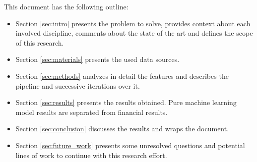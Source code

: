 This document has the following outline:
\begin{itemize}
    \item Section \ref{sec:intro} presents the problem to solve, provides context about each involved discipline, comments about the state of the art and defines the scope of this research.
    \item Section \ref{sec:materials} presents the used data sources.
    \item Section \ref{sec:methods} analyzes in detail the features and describes the pipeline and successive iterations over it.
    \item Section \ref{sec:results} presents the results obtained. Pure machine learning model results are separated from financial results.
    \item Section \ref{sec:conclusion} discusses the results and wraps the document.
    \item Section \ref{sec:future_work} presents some unresolved questions and potential lines of work to continue with this research effort.
\end{itemize}